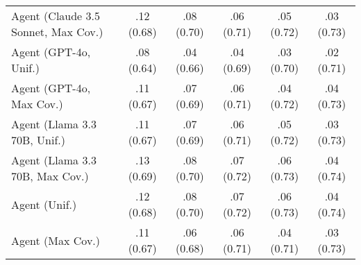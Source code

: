 \begin{table}[h!]
\begin{tabular}{lccccc}
    Agent (Claude 3.5 Sonnet, Max Cov.) & .12 {\small (0.68)} & .08 {\small (0.70)} & .06 {\small (0.71)} & .05 {\small (0.72)} & .03 {\small (0.73)} \\
    Agent (GPT-4o, Unif.) & .08 {\small (0.64)} & .04 {\small (0.66)} & .04 {\small (0.69)} & .03 {\small (0.70)} & .02 {\small (0.71)} \\
    Agent (GPT-4o, Max Cov.) & .11 {\small (0.67)} & .07 {\small (0.69)} & .06 {\small (0.71)} & .04 {\small (0.72)} & .04 {\small (0.73)} \\
    Agent (Llama 3.3 70B, Unif.) & .11 {\small (0.67)} & .07 {\small (0.69)} & .06 {\small (0.71)} & .05 {\small (0.72)} & .03 {\small (0.73)} \\
    Agent (Llama 3.3 70B, Max Cov.) & .13 {\small (0.69)} & .08 {\small (0.70)} & \cellcolor{bronze!30}.07 {\small (0.72)} & .06 {\small (0.73)} & .04 {\small (0.74)} \\
    Agent (Unif.) & .12 {\small (0.68)} & .08 {\small (0.70)} & .07 {\small (0.72)} & .06 {\small (0.73)} & .04 {\small (0.74)} \\
    Agent (Max Cov.) & .11 {\small (0.67)} & .06 {\small (0.68)} & .06 {\small (0.71)} & .04 {\small (0.71)} & .03 {\small (0.73)} \\
    \bottomrule
    \end{tabular}
\end{table}
